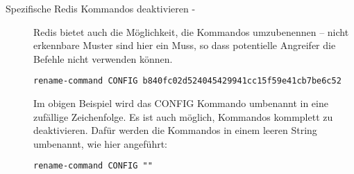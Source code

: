 \begin{description}
\item[Spezifische Redis Kommandos deaktivieren - \newline]
Redis bietet auch die Möglichkeit, die Kommandos umzubenennen – nicht erkennbare Muster sind hier ein Muss, so dass potentielle Angreifer die Befehle nicht verwenden können.

\lstinline{rename-command CONFIG b840fc02d524045429941cc15f59e41cb7be6c52}

Im obigen Beispiel wird das CONFIG Kommando umbenannt in eine zufällige Zeichenfolge. Es ist auch möglich, Kommandos kommplett zu deaktivieren. Dafür werden die Kommandos in einem leeren String umbenannt, wie hier angeführt:

\lstinline{rename-command CONFIG ""}
\end{description}